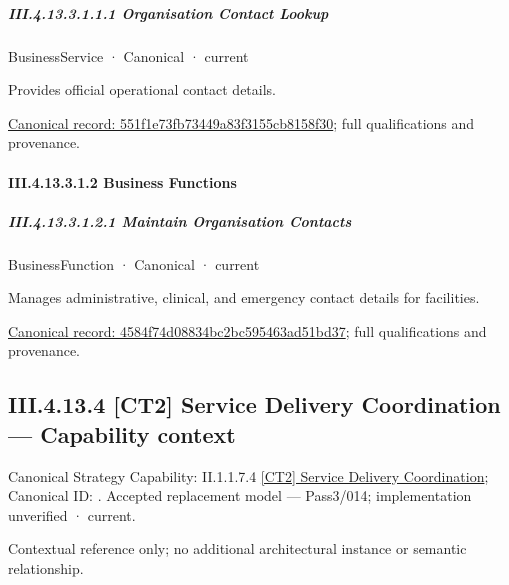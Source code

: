 \subparagraph*{III.4.13.3.1.1.1 Organisation Contact Lookup}
\label{navigation:III.4.13.3.1.1.1}

\label{element:551f1e73fb73449a83f3155cb8158f30}
{\small BusinessService · Canonical · current}\par

Provides official operational contact details.


{\footnotesize \href{../../../../continuum/business/business-service/551f1e73fb73449a83f3155cb8158f30.md}{Canonical record: 551f1e73fb73449a83f3155cb8158f30}; full qualifications and provenance.}\par
\paragraph*{III.4.13.3.1.2 Business Functions}
\label{navigation:III.4.13.3.1.2}

\subparagraph*{III.4.13.3.1.2.1 Maintain Organisation Contacts}
\label{navigation:III.4.13.3.1.2.1}

\label{element:4584f74d08834bc2bc595463ad51bd37}
{\small BusinessFunction · Canonical · current}\par

Manages administrative, clinical, and emergency contact details for facilities.


{\footnotesize \href{../../../../continuum/business/business-function/4584f74d08834bc2bc595463ad51bd37.md}{Canonical record: 4584f74d08834bc2bc595463ad51bd37}; full qualifications and provenance.}\par
\subsection*{III.4.13.4 [CT2] Service Delivery Coordination — Capability context}
\label{navigation:III.4.13.4}

{\small Canonical Strategy Capability: II.1.1.7.4 \hyperref[element:5d3586334499415e94f38d3680834f47]{[CT2] Service Delivery Coordination}; Canonical ID: \texttt{}. Accepted replacement model — Pass3/014; implementation unverified · current.}\par
Contextual reference only; no additional architectural instance or semantic relationship.\par
